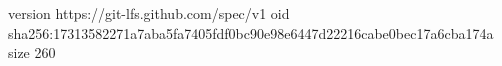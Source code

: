 version https://git-lfs.github.com/spec/v1
oid sha256:17313582271a7aba5fa7405fdf0bc90e98e6447d22216cabe0bec17a6cba174a
size 260
